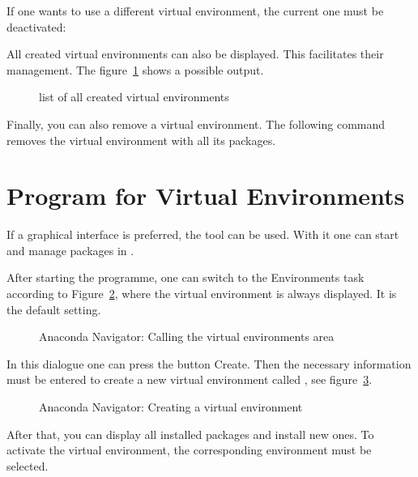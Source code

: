 If one wants to use a different virtual environment, the current one must be deactivated:

\medskip


\medskip



All created virtual environments can also be displayed. This facilitates their management.
The figure~\ref{env:envlist} shows a possible output.

\medskip


\medskip

\begin{figure}
    
    \caption{list of all created virtual environments}
    \label{env:envlist}  
\end{figure}


Finally, you can also remove a virtual environment. The following command removes the virtual environment  with all its packages. 

\medskip



\section{Program  for Virtual Environments}

If a graphical interface is preferred, the tool  can be used. With it one can start and manage packages in .

After starting the programme, one can switch to the \glqq Environments\grqq {} task according to Figure~\ref{env:Navigator}, where the virtual environment  is always displayed. It is the default setting.  

\begin{figure}
    
    \caption{Anaconda Navigator: Calling the virtual environments area}
    
    \label{env:Navigator}  
\end{figure}

In this dialogue one can press the button \glqq Create\grqq{}. Then the necessary information must be entered to create a new virtual environment called , see figure~\ref{env:new}. 

\begin{figure}
    
    \caption{Anaconda Navigator: Creating a virtual environment}
    
    \label{env:new}  
\end{figure}


After that, you can display all installed packages and install new ones.
To activate the virtual environment, the corresponding environment must be selected.
